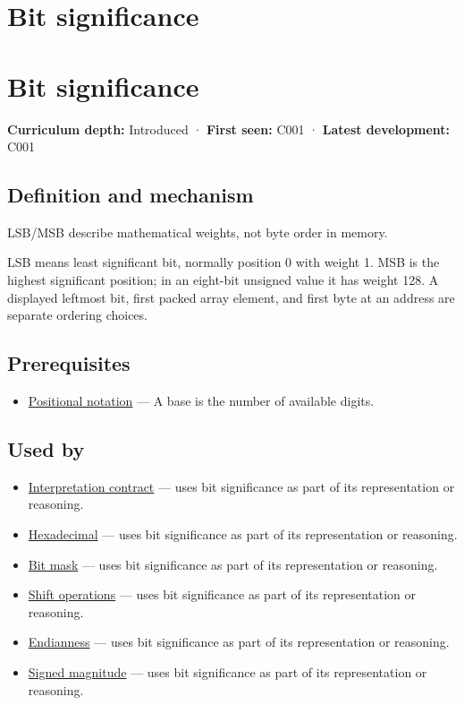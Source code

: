 \hypertarget{appendix-280445746493}{}
\section*{Bit significance}
\section{Bit significance}\label{appendix-280445746493-bit-significance}

\textbf{Curriculum depth:} Introduced · \textbf{First seen:} C001 · \textbf{Latest development:} C001

\subsection{Definition and mechanism}\label{appendix-280445746493-definition-and-mechanism}

LSB/MSB describe mathematical weights, not byte order in memory.

LSB means least significant bit, normally position 0 with weight 1. MSB is the highest significant position; in an eight-bit unsigned value it has weight 128. A displayed leftmost bit, first packed array element, and first byte at an address are separate ordering choices.

\subsection{Prerequisites}\label{appendix-280445746493-prerequisites}

\begin{itemize}
\tightlist
\item
  \hyperref[appendix-83c3f28f7bda]{Positional notation} --- A base is the number of available digits.
\end{itemize}

\subsection{Used by}\label{appendix-280445746493-used-by}

\begin{itemize}
\tightlist
\item
  \hyperref[appendix-f414bd4ed05c]{Interpretation contract} --- uses bit significance as part of its representation or reasoning.
\item
  \hyperref[appendix-6b8075763724]{Hexadecimal} --- uses bit significance as part of its representation or reasoning.
\item
  \hyperref[appendix-dbe5905163c2]{Bit mask} --- uses bit significance as part of its representation or reasoning.
\item
  \hyperref[appendix-73425b25118e]{Shift operations} --- uses bit significance as part of its representation or reasoning.
\item
  \hyperref[appendix-bc07c3d25b18]{Endianness} --- uses bit significance as part of its representation or reasoning.
\item
  \hyperref[appendix-ce20506c8532]{Signed magnitude} --- uses bit significance as part of its representation or reasoning.
\end{itemize}

